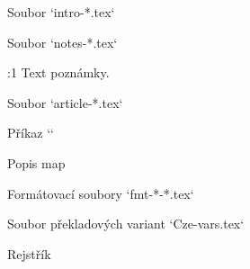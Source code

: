 \def\printedbooks {%
   Gn Ex Lv Nu Dt Joz Sd Rt 1Sa 2Sa 1Kr 2Kr 1Pa 2Pa Ezd Neh
   Est Jb Ž Př Kaz Pís Iz Jr Pl Ez Da Oz Jl Am Abd Jon Mi
   Na Abk Sf Ag Za Mal 
   Mt Mk Lk Jn Sk Ř 1K 2K Ga Ef Fp Ko 1Te 2Te 1Tm 2Tm 
   Tt Fm Žd Jk 1Pt 2Pt 1Jn 2Jn 3Jn Ju Zj
}

\def\printedbooks{Da} 
\processbooks %
\bye
\endtt

 

 Soubor `intro-*.tex`

 Soubor `notes-*.tex`

\begtt
:1 {} %
        Text poznámky.
\endtt




 Soubor `article-*.tex`

 Příkaz `\putCite`

 Popis map

 Formátovací soubory `fmt-*-*.tex`

 Soubor překladových variant `Cze-vars.tex`






\vfill\eject

\sec Rejstřík

\def\_sortinglang{en}
\typosize[9/]
\makeindex
\endmulti

\bye
